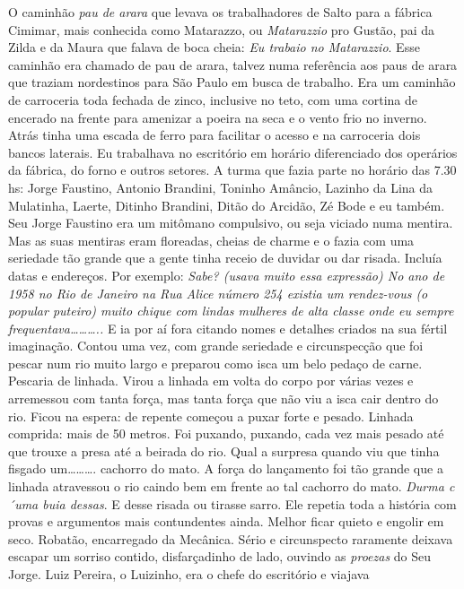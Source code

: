 \documentclass[12pt,brazil,]{book}
\begin{document}
O caminhão \emph{pau de arara} que levava os trabalhadores de Salto para
a fábrica Cimimar, mais conhecida como Matarazzo, ou \emph{Matarazzio}
pro Gustão, pai da Zilda e da Maura que falava de boca cheia: \emph{Eu
trabaio no Matarazzio}. Esse caminhão era chamado de pau de arara,
talvez numa referência aos paus de arara que traziam nordestinos para
São Paulo em busca de trabalho. Era um caminhão de carroceria toda
fechada de zinco, inclusive no teto, com uma cortina de encerado na
frente para amenizar a poeira na seca e o vento frio no inverno. Atrás
tinha uma escada de ferro para facilitar o acesso e na carroceria dois
bancos laterais. Eu trabalhava no escritório em horário diferenciado dos
operários da fábrica, do forno e outros setores. A turma que fazia parte
no horário das 7.30 hs: Jorge Faustino, Antonio Brandini, Toninho
Amâncio, Lazinho da Lina da Mulatinha, Laerte, Ditinho Brandini, Ditão
do Arcidão, Zé Bode e eu também. Seu Jorge Faustino era um mitômano
compulsivo, ou seja viciado numa mentira. Mas as suas mentiras eram
floreadas, cheias de charme e o fazia com uma seriedade tão grande que a
gente tinha receio de duvidar ou dar risada. Incluía datas e endereços.
Por exemplo: \emph{Sabe? (usava muito essa expressão) No ano de 1958 no
Rio de Janeiro na Rua Alice número 254 existia um rendez-vous (o popular
puteiro) muito chique com lindas mulheres de alta classe onde eu sempre
frequentava\ldots{}\ldots{}\ldots{}..} E ia por aí fora citando nomes e
detalhes criados na sua fértil imaginação. Contou uma vez, com grande
seriedade e circunspecção que foi pescar num rio muito largo e preparou
como isca um belo pedaço de carne. Pescaria de linhada. Virou a linhada
em volta do corpo por várias vezes e arremessou com tanta força, mas
tanta força que não viu a isca cair dentro do rio. Ficou na espera: de
repente começou a puxar forte e pesado. Linhada comprida: mais de 50
metros. Foi puxando, puxando, cada vez mais pesado até que trouxe a
presa até a beirada do rio. Qual a surpresa quando viu que tinha fisgado
um\ldots{}\ldots{}\ldots{}. cachorro do mato. A força do lançamento foi
tão grande que a linhada atravessou o rio caindo bem em frente ao tal
cachorro do mato. \emph{Durma c´uma buia dessas}. E desse risada ou
tirasse sarro. Ele repetia toda a história com provas e argumentos mais
contundentes ainda. Melhor ficar quieto e engolir em seco. Robatão,
encarregado da Mecânica. Sério e circunspecto raramente deixava escapar
um sorriso contido, disfarçadinho de lado, ouvindo as \emph{proezas} do
Seu Jorge. Luiz Pereira, o Luizinho, era o chefe do escritório e viajava
\end{document}
